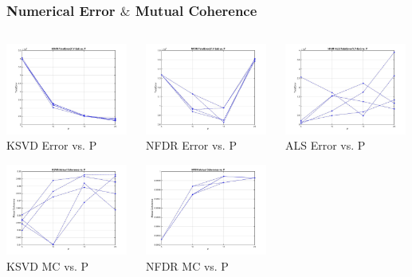 \documentclass{beamer}
\begin{document}
\begin{frame}
\frametitle{Numerical Error $\&$ Mutual Coherence}
\begin{columns}
    \begin{column}{0.33\textwidth}
        \includegraphics[width=4cm,center]{KSVD_TotalError}
        \\ KSVD Error vs. P
        \centering

        \includegraphics[width=4cm,center]{KSVD_Mutual_Coherence}
        \\ KSVD MC vs. P
        \centering
    \end{column}
    \begin{column}{0.33\textwidth}
        \includegraphics[width=4cm,center]{NFDR_TotalError}
        \\ NFDR Error vs. P
        \centering

        \includegraphics[width=4cm,center]{NFDR_Mutual_Coherence}
        \\ NFDR MC vs. P
        \centering
    \end{column}
    \begin{column}{0.33\textwidth}
        \includegraphics[width=4cm,center]{NNMF-ALS_TotalError}
        \\ ALS Error vs. P 
        \centering


\end{column}
\end{columns}
\end{frame}
\end{document}

